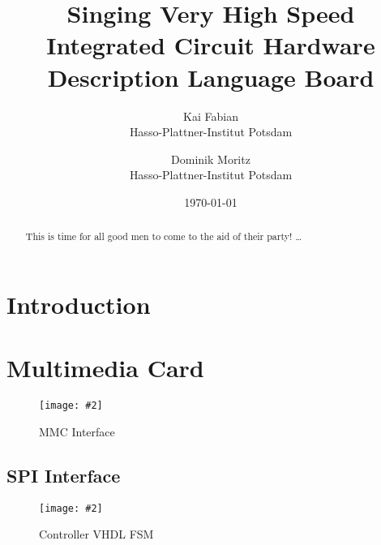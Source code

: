 \documentclass[12pt, a4paper]{article}
\title{Singing Very High Speed Integrated Circuit Hardware Description Language Board}
\author{
        Kai Fabian \\
        Hasso-Plattner-Institut Potsdam\\
            \and
        Dominik Moritz \\
        Hasso-Plattner-Institut Potsdam\\
}
\date{\today}
\newcommand{\image}[4]{
	\begin{figure}[#4]               %
		\centering                     %
		\texttt{[image: \#2]} %
		\caption{#3}                   %
		\label{fig:#2}                 %
	\end{figure}                     %
}
\begin{document}
\maketitle

\begin{abstract}
This is time for all good men to come to the aid of their party! \ldots
\end{abstract}

\tableofcontents

\section{Introduction}

\section{Multimedia Card}

\image{0.49\textwidth}{../mmc_pins.png}{MMC Interface}{ht}

\subsection{SPI Interface}

\image{\textwidth}{../mmc_controller.pdf}{Controller VHDL FSM}{ht}

\listoffigures
\end{document}
